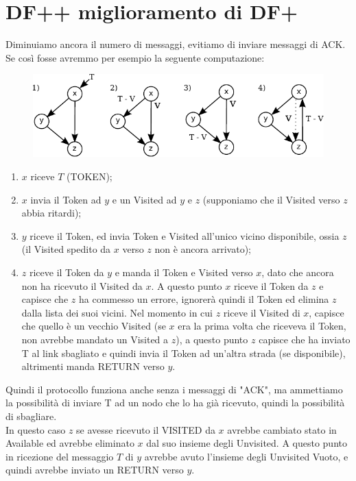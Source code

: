 \section{DF++ miglioramento di DF+}

Diminuiamo ancora il numero di messaggi, evitiamo di inviare messaggi di ACK. Se
così fosse avremmo per esempio la seguente computazione:

\begin{figure}[H]
    \centering
    \includegraphics[width=13cm, keepaspectratio]{images/n_17}
\end{figure}

\begin{enumerate}
    \item $x$ riceve $T$ (TOKEN);
    \item $x$ invia il Token ad $y$ e un Visited ad $y$ e $z$ (supponiamo che il
          Visited verso $z$ abbia ritardi);
    \item $y$ riceve il Token, ed invia Token e Visited all'unico vicino
          disponibile, ossia $z$ (il Visited spedito da $x$ verso $z$ non è ancora
          arrivato);
    \item $z$ riceve il Token da $y$ e manda il Token e Visited verso $x$, dato
          che ancora non ha ricevuto il Visited da $x$. A questo punto $x$ riceve il
          Token da $z$ e capisce che $z$ ha commesso un errore, ignorerà quindi il Token
          ed elimina $z$ dalla lista dei suoi vicini. Nel momento in cui $z$ riceve il
          Visited di $x$, capisce che quello è un vecchio Visited (se $x$ era la prima
          volta che riceveva il Token, non avrebbe mandato un Visited a $z$), a questo
          punto $z$ capisce che ha inviato T al link sbagliato e quindi invia il Token
          ad un'altra strada (se disponibile), altrimenti manda RETURN verso $y$.
\end{enumerate}
Quindi il protocollo funziona anche senza i messaggi di "ACK", ma ammettiamo la
possibilità di inviare T ad un nodo che lo ha già ricevuto, quindi la
possibilità di sbagliare.\\
In questo caso $z$ se avesse ricevuto il VISITED da $x$ avrebbe cambiato stato
in Available ed avrebbe eliminato $x$ dal suo insieme degli Unvisited. A questo
punto in ricezione del messaggio $T$ di $y$ avrebbe avuto l'insieme degli
Unvisited Vuoto, e quindi avrebbe inviato un RETURN verso $y$.


